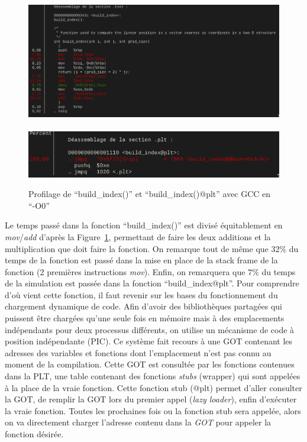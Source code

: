 \documentclass[12pt,a4paper]{article}
\begin{document}
\begin{figure}
    \centering
    \includegraphics[scale=0.40]{figures/optims/gcc-O0/build_index.png}
    \\ \phantom{ } \\
    \includegraphics[scale=0.55]{figures/optims/gcc-O0/build_index@plt.png}
    \caption{Profilage de \enquote{build\_index()} et \enquote{build\_index()@plt} avec \ac{GCC} en \enquote{-O0}}
    \label{fig.optim.build_index}
\end{figure}

Le temps passé dans la fonction \enquote{build\_index()} est divisé
équitablement en \textit{mov}/\textit{add} d'après la
Figure~\ref{fig.optim.build_index}, permettant de faire les deux additions et la
multiplication que doit faire la fonction. On remarque tout de même que $32\%$
du temps de la fonction est passé dans la mise en place de la stack frame de la
fonction (2 premières instructions \textit{mov}). Enfin, on remarquera que $7\%$
du temps de la simulation est passée dans la fonction \enquote{build\_index@plt}.
Pour comprendre d'où vient cette fonction, il faut revenir sur les bases du
fonctionnement du chargement dynamique de code. Afin d'avoir des bibliothèques
partagées qui puissent être chargées qu'une seule fois en mémoire mais à des
emplacements indépendants pour deux processus différents, on utilise un
mécanisme de code à position indépendante (\ac{PIC}). Ce système fait recours à
une \ac{GOT} contenant les adresses des variables et fonctions dont
l'emplacement n'est pas connu au moment de la compilation. Cette \ac{GOT} est
consultée par les fonctions contenues dans la \ac{PLT}, une table contenant des
fonctions \textit{stubs} (wrapper) qui sont appelées à la place de la vraie
fonction. Cette fonction stub (@plt) permet d'aller consulter la \ac{GOT}, de
remplir la \ac{GOT} lors du premier appel (\textit{lazy loader}), enfin
d'exécuter la vraie fonction. Toutes les prochaines fois ou la fonction stub
sera appelée, alors on va directement charger l'adresse contenu dans la
\textit{GOT} pour appeler la fonction désirée.
\end{document}
